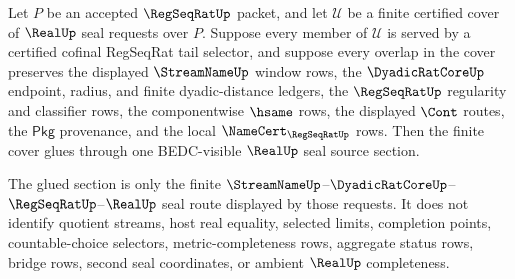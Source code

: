 \begin{theorem}
\label{thm:regseqrat-tail-selector-finite-cover-gluing}
Let $P$ be an accepted $\RegSeqRatUp$ packet, and let $\mathcal U$ be a finite
certified cover of $\RealUp$ seal requests over $P$. Suppose every member of
$\mathcal U$ is served by a certified cofinal RegSeqRat tail selector, and
suppose every overlap in the cover preserves the displayed $\StreamNameUp$
window rows, the $\DyadicRatCoreUp$ endpoint, radius, and finite
dyadic-distance ledgers, the $\RegSeqRatUp$ regularity and classifier rows,
the componentwise $\hsame$ rows, the displayed $\Cont$ routes, the
$\mathsf{Pkg}$ provenance, and the local $\NameCert_{\RegSeqRatUp}$ rows.
Then the finite cover glues through one BEDC-visible $\RealUp$ seal source
section.

The glued section is only the finite
$\StreamNameUp$--$\DyadicRatCoreUp$--$\RegSeqRatUp$--$\RealUp$ seal route
displayed by those requests. It does not identify quotient streams, host real
equality, selected limits, completion points, countable-choice selectors,
metric-completeness rows, aggregate status rows, bridge rows, second seal
coordinates, or ambient $\RealUp$ completeness.
\end{theorem}
